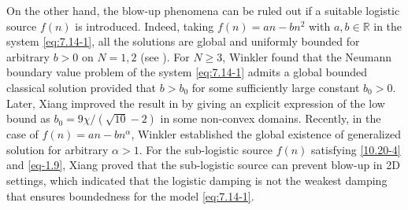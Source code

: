 \documentclass[10pt,a4paper]{amsart}
\numberwithin{equation}{section}
\begin{document}
On the other hand, the blow-up phenomena can be ruled out if a suitable logistic source 
$f(n)$ is introduced. Indeed, taking $f(n)=an-bn^2$ with $a, b \in
\mathbb{R}$ in the system \eqref{eq:7.14-1}, all the solutions are global and uniformly 
bounded for arbitrary \( b > 0 \) on \( N = 1, 2 \) (see
\cite{Xiang2018-C,Osaki-2002}). 
For \( N \geq 3 \), Winkler \cite{Winkler2010} found that the Neumann boundary value 
problem of the system \eqref{eq:7.14-1} admits a global bounded classical
solution provided that \( b>b_0\) for some sufficiently large constant $b_0>0$. 
Later, Xiang \cite{Xiang2018-J} improved the result in \cite{Winkler2010} by giving an
explicit expression of the low bound as \( b_0=9\chi/(\sqrt{10} - 2) \) 
in some non-convex domains. Recently, in the case of \( f(n) = an -b n^\alpha\),  
Winkler \cite{Winkler2023} established the global existence of generalized solution  
for arbitrary \( \alpha > 1 \). For the
sub-logistic source $f(n)$ satisfying \eqref{10.20-4} and 
\eqref{eq-1.9}, Xiang \cite{Xiang2018-2} proved that the sub-logistic source can 
prevent blow-up in 2D settings, which indicated that the logistic damping is not
the weakest damping that ensures boundedness for the model \eqref{eq:7.14-1}.
\end{document}

